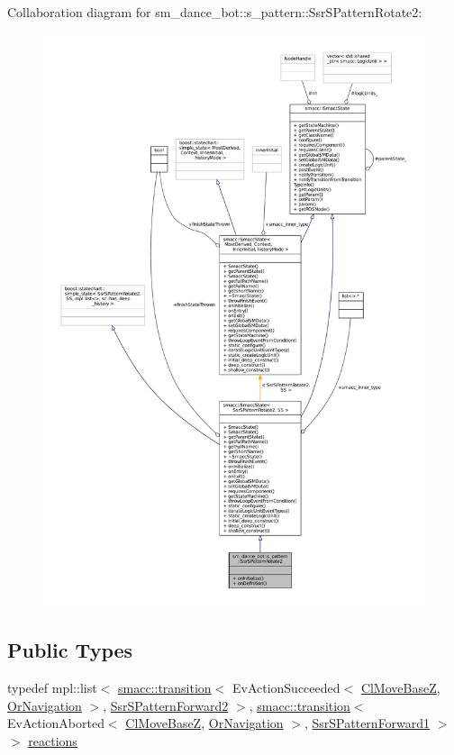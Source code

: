 Collaboration diagram for sm\+\_\+dance\+\_\+bot\+:\+:s\+\_\+pattern\+:\+:Ssr\+S\+Pattern\+Rotate2\+:
\nopagebreak
\begin{figure}[H]
\begin{center}
\leavevmode
\includegraphics[width=350pt]{structsm__dance__bot_1_1s__pattern_1_1SsrSPatternRotate2__coll__graph}
\end{center}
\end{figure}
\subsection*{Public Types}
\begin{DoxyCompactItemize}
\item 
typedef mpl\+::list$<$ \hyperlink{classsmacc_1_1transition}{smacc\+::transition}$<$ Ev\+Action\+Succeeded$<$ \hyperlink{classmove__base__z__client_1_1ClMoveBaseZ}{Cl\+Move\+BaseZ}, \hyperlink{classsm__dance__bot_1_1OrNavigation}{Or\+Navigation} $>$, \hyperlink{structsm__dance__bot_1_1s__pattern_1_1SsrSPatternForward2}{Ssr\+S\+Pattern\+Forward2} $>$, \hyperlink{classsmacc_1_1transition}{smacc\+::transition}$<$ Ev\+Action\+Aborted$<$ \hyperlink{classmove__base__z__client_1_1ClMoveBaseZ}{Cl\+Move\+BaseZ}, \hyperlink{classsm__dance__bot_1_1OrNavigation}{Or\+Navigation} $>$, \hyperlink{structsm__dance__bot_1_1s__pattern_1_1SsrSPatternForward1}{Ssr\+S\+Pattern\+Forward1} $>$ $>$ \hyperlink{structsm__dance__bot_1_1s__pattern_1_1SsrSPatternRotate2_ad489a09f2ef7d70c2fa95771de457c25}{reactions}
\end{DoxyCompactItemize}
